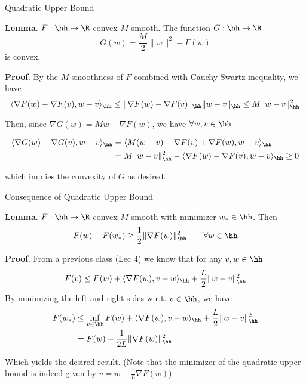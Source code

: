 \documentclass[10pt,mathserif]{beamer}
\begin{document}
\begin{frame}{Quadratic Upper Bound}

{\bf Lemma}. $F:\hh\to\R$ convex $M$-smooth. The function $G:\hh\to\R$
$$
G(w) = \frac{M}{2}\|w\|^2 - F(w)
$$
is convex.  

\vfill

{\bf Proof}. By the $M$-smoothness of $F$ combined with Cauchy-Swartz inequality, we have
{
\footnotesize
$$
\langle \nabla F(w) - \nabla F(v), w - v\rangle_\hh \leq \|\nabla F(w) - \nabla F(v)\|_\hh \| w - v\|_\hh \leq M\|w - v\|_\hh^2
$$
}

Then, since $\nabla G(w) = M w - \nabla F(w)$, we have $\forall w,v\in\hh$

{
  \footnotesize
\begin{align*}
\langle \nabla G(w) - \nabla G(v), w - v\rangle_\hh & = \langle M(w - v) - \nabla F(v) + \nabla F(w) , w - v\rangle_\hh \\
  & = M\|w - v\|_\hh^2 - \langle \nabla F(w) - \nabla F(v), w - v\rangle_\hh \geq 0
\end{align*}
}

which implies the convexity of $G$ as desired. 

\end{frame}

\begin{frame}{Consequence of Quadratic Upper Bound}


{\bf Lemma}. $F:\hh\to\R$ convex $M$-smooth with minimizer $w_*\in\hh$. Then 
$$
  F(w) - F(w_*)\geq \frac{1}{2}\|\nabla F(w)\|_\hh^2 \qquad \forall w\in\hh
$$

{\bf Proof}. From a previous class (Lec $4$) we know that for any $v,w\in\hh$ 
{\footnotesize
$$
F(v) \leq F(w) + \langle \nabla F(w), v - w\rangle_\hh + \frac{L}{2}\|w - v\|_\hh^2
$$
}
By minimizing the left and right sides w.r.t. $v\in\hh$, we have
%
{
\footnotesize
\begin{align*}
F(w_*) &  \leq \inf_{v\in\hh} F(w) + \langle \nabla F(w), v - w\rangle_\hh + \frac{L}{2}\|w - v\|_\hh^2 \\ & = F(w) - \frac{1}{2L}\|\nabla F(w)\|_\hh^2
\end{align*}
}

Which yields the desired result. (Note that the minimizer of the quadratic upper bound is indeed given by $v = w - \frac{1}{L}\nabla F(w)$).
\end{frame}
\end{document}
